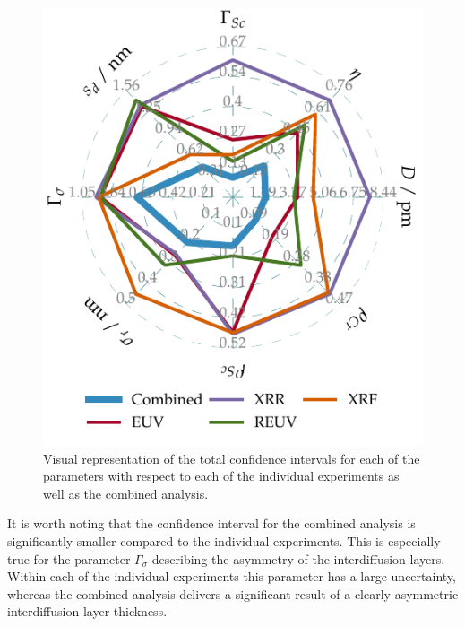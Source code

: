 \begin{figure}[htbp]
  \centering
  
\includegraphics{img/CrSc_confidence_intervals_radar}
  \caption{Visual representation of the total confidence intervals for each of 
the parameters with respect to each of the individual experiments as well as 
the combined analysis.}
  \label{fig:confidence_intervals}
\end{figure}
It is worth noting that the confidence interval for the combined analysis is 
significantly smaller compared to the individual experiments. This is 
especially true for the parameter $\Gamma_\sigma$ describing the asymmetry of 
the interdiffusion layers. Within each of the individual experiments this 
parameter has a large uncertainty, whereas the combined analysis delivers a 
significant result of a clearly asymmetric interdiffusion layer thickness.



